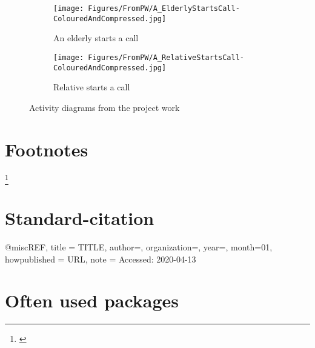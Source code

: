 \begin{figure}[H]
\centering
    \hspace*{\fill}%
    \begin{subfigure}[b]{0.525\textwidth}
            \texttt{[image: Figures/FromPW/A\_ElderlyStartsCall-ColouredAndCompressed.jpg]}
            \caption{An elderly starts a  call}
            \label{fig:A_ElderlyStartsCall}
    \end{subfigure}%
    \hfill
    \begin{subfigure}[b]{0.455\textwidth}
            \centering
            \texttt{[image: Figures/FromPW/A\_RelativeStartsCall-ColouredAndCompressed.jpg]}
            \caption{Relative starts a  call}
            \label{fig:A_RelativeStartsCall}
    \end{subfigure}
    \hspace*{\fill}%
    \caption{Activity diagrams from the project work \cite{projectwork}}
    \label{fig:Activites-from-PW}
\end{figure}

\section{Footnotes}

\footnote
    {\href{}
    {}}

\section{Standard-citation}

@misc{REF,
  title = {TITLE},
  author={},
  organization={},
  year={},
  month={01},
  howpublished = {URL},
  note = {Accessed: 2020-04-13}
}

\section{Often used packages}

\usepackage{biblatex}               %
\usepackage{dirtytalk}              %
\usepackage{float}                  %
\usepackage{graphicx}               %
\usepackage[hidelinks]{hyperref}    %
\usepackage{minted}                 %
\usepackage{multirow}               %
\usepackage{wrapfig}                %

